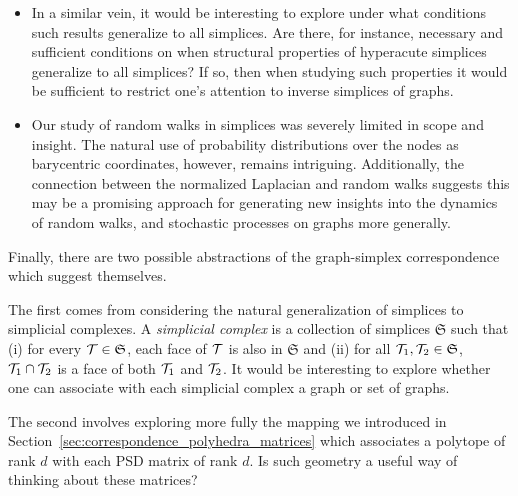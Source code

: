\begin{itemize}
	\item In  a  similar vein, it would be interesting to explore under what conditions  such results generalize  to all simplices. Are there, for instance, necessary and sufficient conditions on when structural  properties of hyperacute simplices  generalize to  all simplices? If so, then when studying such  properties it would be sufficient  to restrict one's attention to inverse simplices of  graphs. 
	
	\item Our study of random walks in  simplices was severely limited  in scope and insight. The natural use of probability distributions over  the nodes as barycentric coordinates,  however, remains intriguing. Additionally,  the connection between  the normalized Laplacian and random walks suggests this  may be a promising approach for generating new insights into the dynamics of random  walks, and stochastic processes on graphs more generally.    
\end{itemize}

Finally, there are two  possible abstractions of the graph-simplex correspondence which  suggest themselves. 

The first comes from considering the natural generalization of simplices to simplicial complexes. A \emph{simplicial complex} is a collection of simplices $\mathfrak{S}$ such that (i) for every $\mathcal{T}\in\mathfrak{S}$, each face of $\mathcal{T}$ is also in $\mathfrak{S}$ and (ii) for all $\mathcal{T}_1,\mathcal{T}_2\in\mathfrak{S}$, $\mathcal{T}_1\cap\mathcal{T}_2$ is a face of  both  $\mathcal{T}_1$ and $\mathcal{T}_2$. It would be interesting to explore whether one can  associate with each simplicial complex a graph or set of graphs. 

The second involves exploring more fully the mapping  we introduced  in  Section~\ref{sec:correspondence_polyhedra_matrices} which associates a polytope of rank  $d$ with each PSD matrix of rank  $d$. Is  such geometry a useful  way of thinking about these matrices? 